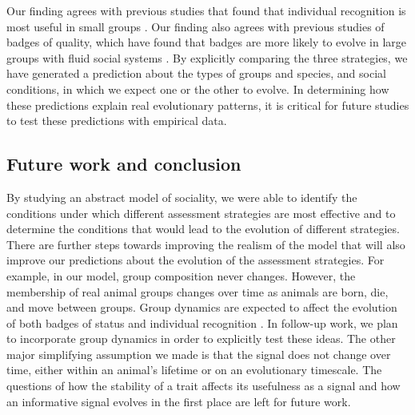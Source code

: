Our finding agrees with previous studies that found that individual recognition is most useful in small groups \citep{Veiga:1993fk}. Our finding also agrees with previous studies of badges of quality, which have found that badges are more likely to evolve in large groups with fluid social systems \citep{Rohwer:1975fk,Tibbetts:2009kx}. By explicitly comparing the three strategies, we have generated a prediction about the types of groups and species, and social conditions, in which we expect one or the other to evolve. In determining how these predictions explain real evolutionary patterns, it is critical for future studies to test these predictions with empirical data. 

\subsection*{Future work and conclusion}
 
By studying an abstract model of sociality, we were able to identify the conditions under which different assessment strategies are most effective and to determine the conditions that would lead to the evolution of different strategies. There are further steps towards improving the realism of the model that will also improve our predictions about the evolution of the assessment strategies. For example, in our model, group composition never changes. However, the membership of real animal groups changes over time as animals are born, die, and move between groups. Group dynamics are expected to affect the evolution of both badges of status \citep{Rohwer:1975fk,Tibbetts:2009kx} and individual recognition \citep{Whitfield:1987tg,Veiga:1993fk}. In follow-up work, we plan to incorporate group dynamics in order to explicitly test these ideas. The other major simplifying assumption we made is that the signal does not change over time, either within an animal's lifetime or on an evolutionary timescale. The questions of how the stability of a trait affects its usefulness as a signal and how an informative signal evolves in the first place are left for future work.

